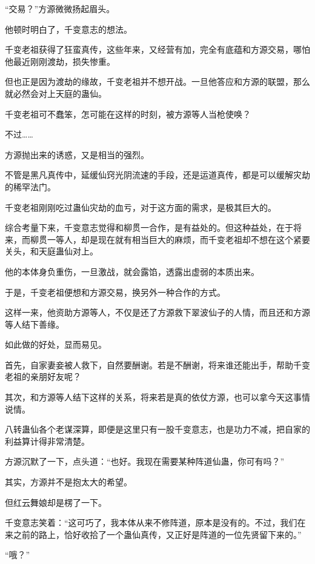 
\begin{this_body}



“交易？”方源微微扬起眉头。

他顿时明白了，千变意志的想法。

千变老祖获得了狂蛮真传，这些年来，又经营有加，完全有底蕴和方源交易，哪怕他最近刚刚渡劫，损失惨重。

但也正是因为渡劫的缘故，千变老祖并不想开战。一旦他答应和方源的联盟，那么就必然会对上天庭的蛊仙。

千变老祖可不蠢笨，怎可能在这样的时刻，被方源等人当枪使唤？

不过……

方源抛出来的诱惑，又是相当的强烈。

不管是黑凡真传中，延缓仙窍光阴流速的手段，还是运道真传，都是可以缓解灾劫的稀罕法门。

千变老祖刚刚吃过蛊仙灾劫的血亏，对于这方面的需求，是极其巨大的。

综合考量下来，千变意志觉得和柳贯一合作，是有益处的。但这种益处，在于将来，而柳贯一等人，却是现在就有相当巨大的麻烦，而千变老祖却不想在这个紧要关头，和天庭蛊仙对上。

他的本体身负重伤，一旦激战，就会露馅，透露出虚弱的本质出来。

于是，千变老祖便想和方源交易，换另外一种合作的方式。

这样一来，他资助方源等人，不仅是还了方源救下翠波仙子的人情，而且还和方源等人结下善缘。

如此做的好处，显而易见。

首先，自家妻妾被人救下，自然要酬谢。若是不酬谢，将来谁还能出手，帮助千变老祖的亲朋好友呢？

其次，和方源等人结下这样的关系，将来若是真的依仗方源，也可以拿今天这事情说情。

八转蛊仙各个老谋深算，即便是这里只有一股千变意志，也是功力不减，把自家的利益算计得非常清楚。

方源沉默了一下，点头道：“也好。我现在需要某种阵道仙蛊，你可有吗？”

其实，方源并不是抱太大的希望。

但红云舞娘却是楞了一下。

千变意志笑着：“这可巧了，我本体从来不修阵道，原本是没有的。不过，我们在来之前的路上，恰好收拾了一个蛊仙真传，又正好是阵道的一位先贤留下来的。”

“哦？”


\end{this_body}
